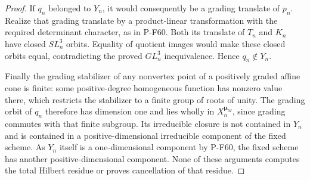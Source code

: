 \begin{proof}
If $q_n$ belonged to $Y_n$, it would consequently be
a grading translate of $p_n$.  Realize that grading
translate by a product-linear transformation with
the required determinant character, as in P-F60.
Both its translate of $T_n$ and $K_n$ have closed
$SL_n^3$ orbits.  Equality of quotient images would
make these closed orbits equal, contradicting the
proved $GL_n^3$ inequivalence.  Hence $q_n\notin Y_n$.

Finally the grading stabilizer of any nonvertex point
of a positively graded affine cone is finite: some
positive-degree homogeneous function has nonzero
value there, which restricts the stabilizer to a
finite group of roots of unity.  The grading orbit
of $q_n$ therefore has dimension one and lies wholly
in $X_n^{\boldsymbol\mu_M}$, since grading commutes
with that finite subgroup.  Its irreducible closure
is not contained in $Y_n$ and is contained in a
positive-dimensional irreducible component of the
fixed scheme.  As $Y_n$ itself is a one-dimensional
component by P-F60, the fixed scheme has another
positive-dimensional component.  None of these
arguments computes the total Hilbert residue or
proves cancellation of that residue.
\end{proof}
